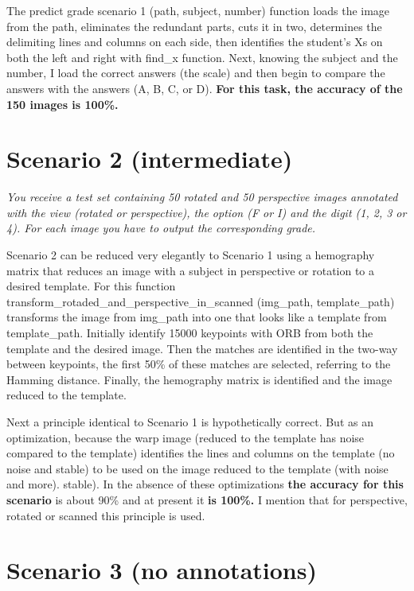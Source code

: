 \documentclass[12pt]{article}
\begin{document}
The predict grade scenario 1 (path, subject, number) function loads the image from the path, eliminates 
the redundant parts, cuts it in two, determines the delimiting lines and columns on each side, then 
identifies the student's Xs on both the left and right with find\_x function. Next, knowing the subject 
and the number, I load the correct answers (the scale) and then begin to compare the answers with the 
answers (A, B, C, or D). \textbf{For this task, the accuracy of the 150 images is 100\%.}

\section*{Scenario 2 (intermediate)}

\emph{You receive a test set containing 50 rotated and 50 perspective images annotated with the view 
(rotated or perspective), the option (F or I) and the digit (1, 2, 3 or 4). For each image you have 
to output the corresponding grade.}

Scenario 2 can be reduced very elegantly to Scenario 1 using a hemography matrix that reduces an 
image with a subject in perspective or rotation to a desired template. For this function 
transform\_rotaded\_and\_perspective\_in\_scanned (img\_path, template\_path) transforms the image 
from img\_path into one that looks like a template from template\_path. Initially identify 15000 
keypoints with ORB from both the template and the desired image. 
Then the matches are identified in the two-way between keypoints, 
the first 50\% of these matches are selected, referring to the Hamming distance. 
Finally, the hemography matrix is ​​identified and the image reduced to the template. 
\par

Next a principle identical to Scenario 1 is hypothetically correct. But as an optimization, 
because the warp image (reduced to the template has noise compared to the template) identifies 
the lines and columns on the template (no noise and stable) to be used on the image reduced to 
the template (with noise and more). stable). In the absence of these optimizations \textbf{the accuracy 
for this scenario} is about 90\% and at present it \textbf{is 100\%.} I mention that for perspective, 
rotated or scanned this principle is used.

\section*{Scenario 3 (no annotations)}
\end{document}
